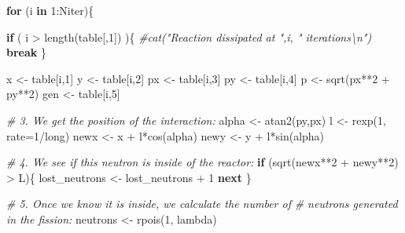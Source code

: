 \documentclass[11pt]{article}
\newenvironment{Shaded}{}{}
\newcommand{\DecValTok}[1]{\textcolor[rgb]{0.25,0.63,0.44}{{#1}}}
\newcommand{\CommentTok}[1]{\textcolor[rgb]{0.38,0.63,0.69}{\textit{{#1}}}}
\newcommand{\OtherTok}[1]{\textcolor[rgb]{0.00,0.44,0.13}{{#1}}}
\newcommand{\FunctionTok}[1]{\textcolor[rgb]{0.02,0.16,0.49}{{#1}}}
\newcommand{\NormalTok}[1]{{#1}}
\newcommand{\SpecialCharTok}[1]{\textcolor[rgb]{0.25,0.44,0.63}{{#1}}}
\newcommand{\ControlFlowTok}[1]{\textcolor[rgb]{0.00,0.44,0.13}{\textbf{{#1}}}}
\newcommand{\AttributeTok}[1]{\textcolor[rgb]{0.49,0.56,0.16}{{#1}}}
\begin{document}
\begin{Shaded}
\begin{Highlighting}[]
        \ControlFlowTok{for}\NormalTok{ (i }\ControlFlowTok{in} \DecValTok{1}\SpecialCharTok{:}\NormalTok{Niter)\{}
            
            \ControlFlowTok{if}\NormalTok{ ( i }\SpecialCharTok{\textgreater{}} \FunctionTok{length}\NormalTok{(table[,}\DecValTok{1}\NormalTok{]) )\{}
                \CommentTok{\#cat("Reaction dissipated at ",i, " iterations\textbackslash{}n")}
                \ControlFlowTok{break}
\NormalTok{                \}}

\NormalTok{            x }\OtherTok{\textless{}{-}}\NormalTok{ table[i,}\DecValTok{1}\NormalTok{]}
\NormalTok{            y }\OtherTok{\textless{}{-}}\NormalTok{ table[i,}\DecValTok{2}\NormalTok{]}
\NormalTok{            px }\OtherTok{\textless{}{-}}\NormalTok{ table[i,}\DecValTok{3}\NormalTok{]}
\NormalTok{            py }\OtherTok{\textless{}{-}}\NormalTok{ table[i,}\DecValTok{4}\NormalTok{]}
\NormalTok{            p }\OtherTok{\textless{}{-}} \FunctionTok{sqrt}\NormalTok{(px}\SpecialCharTok{**}\DecValTok{2} \SpecialCharTok{+}\NormalTok{ py}\SpecialCharTok{**}\DecValTok{2}\NormalTok{)}
\NormalTok{            gen }\OtherTok{\textless{}{-}}\NormalTok{ table[i,}\DecValTok{5}\NormalTok{]}

            \CommentTok{\# 3. We get the position of the interaction:}
\NormalTok{            alpha }\OtherTok{\textless{}{-}} \FunctionTok{atan2}\NormalTok{(py,px)}
\NormalTok{            l }\OtherTok{\textless{}{-}} \FunctionTok{rexp}\NormalTok{(}\DecValTok{1}\NormalTok{, }\AttributeTok{rate=}\DecValTok{1}\SpecialCharTok{/}\NormalTok{long)}
\NormalTok{            newx }\OtherTok{\textless{}{-}}\NormalTok{ x }\SpecialCharTok{+}\NormalTok{ l}\SpecialCharTok{*}\FunctionTok{cos}\NormalTok{(alpha)}
\NormalTok{            newy }\OtherTok{\textless{}{-}}\NormalTok{ y }\SpecialCharTok{+}\NormalTok{ l}\SpecialCharTok{*}\FunctionTok{sin}\NormalTok{(alpha)}

            \CommentTok{\# 4. We see if this neutron is inside of the reactor:}
            \ControlFlowTok{if}\NormalTok{ (}\FunctionTok{sqrt}\NormalTok{(newx}\SpecialCharTok{**}\DecValTok{2} \SpecialCharTok{+}\NormalTok{ newy}\SpecialCharTok{**}\DecValTok{2}\NormalTok{) }\SpecialCharTok{\textgreater{}}\NormalTok{ L)\{}
\NormalTok{                lost\_neutrons }\OtherTok{\textless{}{-}}\NormalTok{ lost\_neutrons }\SpecialCharTok{+} \DecValTok{1}
                \ControlFlowTok{next}
\NormalTok{                \}}

            \CommentTok{\# 5. Once we know it is inside, we calculate the number of}
            \CommentTok{\# neutrons generated in the fission:}
\NormalTok{            neutrons }\OtherTok{\textless{}{-}} \FunctionTok{rpois}\NormalTok{(}\DecValTok{1}\NormalTok{, lambda)}


\end{Highlighting}
\end{Shaded}
\end{document}
